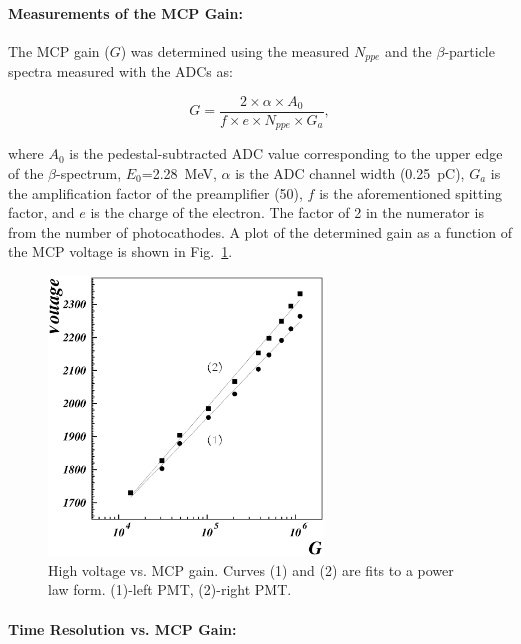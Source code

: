 \paragraph*{Measurements of the MCP Gain:}

The MCP gain ($G$) was determined using the measured $N_{ppe}$ and the
$\beta$-particle spectra measured with the ADCs as:

\begin{equation}
G = \frac{2 \times \alpha \times A_{0}}{f \times e \times N_{ppe} \times G_a},
\label{gain}
\end{equation}

\noindent
where $A_0$ is the pedestal-subtracted ADC value corresponding to the upper 
edge of the $\beta$-spectrum, $E_0$=2.28~MeV, $\alpha$ is the ADC channel 
width (0.25~pC), $G_a$ is the amplification factor of the preamplifier (50), 
$f$ is the aforementioned spitting factor, and $e$ is the charge of the
electron.  The factor of 2 in the numerator is from the number of 
photocathodes.  A plot of the determined gain as a function of the MCP 
voltage is shown in Fig.~\ref{hvvsgain85011}.

\begin{figure}[htbp]
\centering
\includegraphics[width=0.65\textwidth]{hvvsgain_picture85011.ps}
\caption{\small{High voltage vs. MCP gain.  Curves (1) and (2) are fits to 
a power law form.  (1)-left PMT, (2)-right PMT.}}
\label{hvvsgain85011}
\end{figure}

\paragraph*{Time Resolution vs. MCP Gain:}

